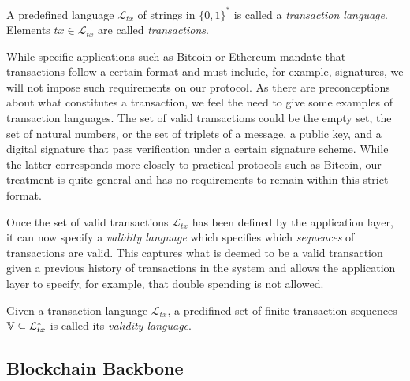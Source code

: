 \begin{definition}[Transaction]
  A predefined language $\mathcal{L}_{tx}$ of strings in $\{0, 1\}^*$ is called
  a \emph{transaction language}. Elements $tx \in \mathcal{L}_{tx}$ are called
  \emph{transactions}.
\end{definition}

While specific applications such as Bitcoin or Ethereum mandate that
transactions follow a certain format and must include, for example, signatures,
we will not impose such requirements on our protocol. As there are
preconceptions about what constitutes a transaction, we feel the need to give
some examples of transaction languages. The set of valid transactions could be
the empty set, the set of natural numbers, or the set of triplets of a message,
a public key, and a digital signature that pass verification under a certain
signature scheme. While the latter corresponds more closely to practical
protocols such as Bitcoin, our treatment is quite general and has no
requirements to remain within this strict format.

Once the set of valid transactions $\mathcal{L}_{tx}$ has been defined by the
application layer, it can now specify a \emph{validity language} which specifies
which \emph{sequences} of transactions are valid. This captures what is deemed
to be a valid transaction given a previous history of transactions in the
system and allows the application layer to specify, for example, that double
spending is not allowed.

\begin{definition}
  Given a transaction language $\mathcal{L}_{tx}$, a predifined set of finite
  transaction sequences $\mathbb{V} \subseteq \mathcal{L}_{tx}^*$ is called its
  \emph{validity language}.
\end{definition}

\subsection{Blockchain Backbone}


